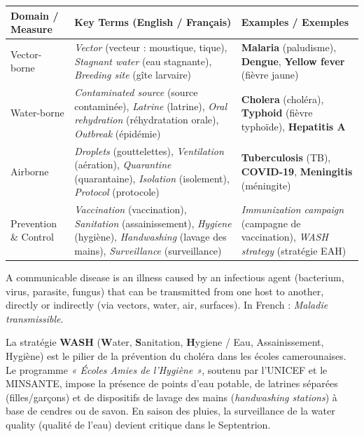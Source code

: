 \documentclass[11pt]{article}
\newcommand{\cle}[1]{{\popxbold\color{popdark}#1}}
\begin{document}
\begin{center}
\begin{tabularx}{\linewidth}{|l|X|X|}\hline
\rowcolor{popblueL}
\textbf{Domain / Measure} & \textbf{Key Terms (English / Français)} & \textbf{Examples / Exemples} \\ \hline
\cle{Vector-borne} & \emph{Vector} (vecteur : moustique, tique), \emph{Stagnant water} (eau stagnante), \emph{Breeding site} (gîte larvaire) & \textbf{Malaria} (paludisme), \textbf{Dengue}, \textbf{Yellow fever} (fièvre jaune) \\ \hline
\cle{Water-borne} & \emph{Contaminated source} (source contaminée), \emph{Latrine} (latrine), \emph{Oral rehydration} (réhydratation orale), \emph{Outbreak} (épidémie) & \textbf{Cholera} (choléra), \textbf{Typhoid} (fièvre typhoïde), \textbf{Hepatitis A} \\ \hline
\cle{Airborne} & \emph{Droplets} (gouttelettes), \emph{Ventilation} (aération), \emph{Quarantine} (quarantaine), \emph{Isolation} (isolement), \emph{Protocol} (protocole) & \textbf{Tuberculosis} (TB), \textbf{COVID-19}, \textbf{Meningitis} (méningite) \\ \hline
\cle{Prevention \& Control} & \emph{Vaccination} (vaccination), \emph{Sanitation} (assainissement), \emph{Hygiene} (hygiène), \emph{Handwashing} (lavage des mains), \emph{Surveillance} (surveillance) & \emph{Immunization campaign} (campagne de vaccination), \emph{WASH strategy} (stratégie EAH) \\ \hline
\end{tabularx}
\end{center}

\begin{definition}
A \cle{communicable disease} is an illness caused by an infectious agent (bacterium, virus, parasite, fungus) that can be transmitted from one host to another, directly or indirectly (via vectors, water, air, surfaces). In French : \emph{Maladie transmissible}.
\end{definition}

\begin{savaistu}
La stratégie \textbf{WASH} (\textbf{W}ater, \textbf{S}anitation, \textbf{H}ygiene / Eau, Assainissement, Hygiène) est le pilier de la prévention du choléra dans les écoles camerounaises. Le programme \emph{« Écoles Amies de l'Hygiène »}, soutenu par l'UNICEF et le MINSANTE, impose la présence de points d'eau potable, de latrines séparées (filles/garçons) et de dispositifs de lavage des mains (\emph{handwashing stations}) à base de cendres ou de savon. En saison des pluies, la surveillance de la \cle{water quality} (qualité de l'eau) devient critique dans le Septentrion.
\end{savaistu}
\end{document}
